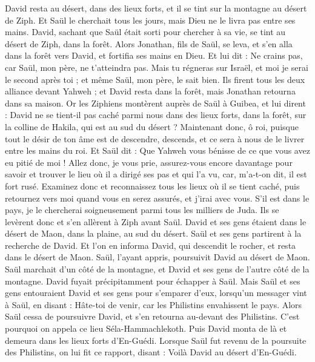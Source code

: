 \begin{multicols}{2}
David resta au désert, dans des lieux forts, et il se tint sur la montagne au désert de Ziph. Et Saül le cherchait tous les jours, mais Dieu ne le livra pas entre ses mains.
David, sachant que Saül était sorti pour chercher à sa vie, se tint au désert de Ziph, dans la forêt.
Alors Jonathan, fils de Saül, se leva, et s'en alla dans la forêt vers David, et fortifia ses mains en Dieu.
Et lui dit : Ne crains pas, car Saül, mon père, ne t'atteindra pas. Mais tu régneras sur Israël, et moi je serai le second après toi ; et même Saül, mon père, le sait bien.
Ils firent tous les deux alliance devant Yahweh ; et David resta dans la forêt, mais Jonathan retourna dans sa maison.
Or les Ziphiens montèrent auprès de Saül à Guibea, et lui dirent : David ne se tient-il pas caché parmi nous dans des lieux forts, dans la forêt, sur la colline de Hakila, qui est au sud du désert ?
Maintenant donc, ô roi, puisque tout le désir de ton âme est de descendre, descends, et ce sera à nous de le livrer entre les mains du roi.
Et Saül dit : Que Yahweh vous bénisse de ce que vous avez eu pitié de moi !
Allez donc, je vous prie, assurez-vous encore davantage pour savoir et trouver le lieu où il a dirigé ses pas et qui l'a vu, car, m'a-t-on dit, il est fort rusé.
Examinez donc et reconnaissez tous les lieux où il se tient caché, puis retournez vers moi quand vous en serez assurés, et j'irai avec vous. S'il est dans le pays, je le chercherai soigneusement parmi tous les milliers de Juda.
Ils se levèrent donc et s'en allèrent à Ziph avant Saül. David et ses gens étaient dans le désert de Maon, dans la plaine, au sud du désert.
Saül et ses gens partirent à la recherche de David. Et l'on en informa David, qui descendit le rocher, et resta dans le désert de Maon. Saül, l'ayant appris, poursuivit David au désert de Maon.
Saül marchait d'un côté de la montagne, et David et ses gens de l'autre côté de la montagne. David fuyait précipitamment pour échapper à Saül. Mais Saül et ses gens entouraient David et ses gens pour s'emparer d'eux,
lorsqu'un messager vint à Saül, en disant : Hâte-toi de venir, car les Philistins envahissent le pays.
Alors Saül cessa de poursuivre David, et s'en retourna au-devant des Philistins. C'est pourquoi on appela ce lieu Séla-Hammachlekoth.
\VerseOne{}Puis David monta de là et demeura dans les lieux forts d'En-Guédi.
Lorsque Saül fut revenu de la poursuite des Philistins, on lui fit ce rapport, disant : Voilà David au désert d'En-Guédi.

\end{multicols}
